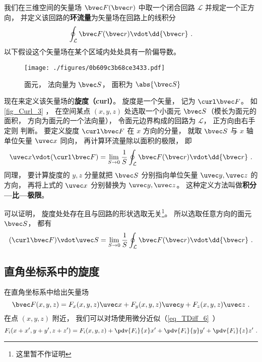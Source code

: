 

我们在三维空间的矢量场 $\bvec F(\bvec r)$ 中取一个闭合回路 $\mathcal L$ 并规定一个正方向， 并定义该回路的\textbf{环流量}为矢量场在回路上的线积分
\begin{equation}
\oint_{\mathcal L} \bvec F(\bvec r) \vdot \dd{\bvec r}~.
\end{equation}
以下假设这个矢量场在某个区域内处处具有一阶偏导数。

\begin{figure}[ht]
\centering
\texttt{[image: ./figures/0b609c3b68ce3433.pdf]}
\caption{面元， 法向量为 $\bvec S$， 面积为 $\abs{\bvec S}$}\label{fig_Curl_3}
\end{figure}

现在来定义该矢量场的\textbf{旋度（curl）}。 旋度是一个矢量， 记为 $\curl \bvec F$。 如\autoref{fig_Curl_3} ， 在空间某点 $(x,y,z)$ 处选取一个小面元 $\bvec S$（模长为面元的面积， 方向为面元的一个法向量）， 令面元边界构成的回路为 $\mathcal L$， 正方向由右手定则 判断。 要定义旋度 $\curl \bvec F$ 在 $x$ 方向的分量， 就取 $\bvec S$ 与 $x$ 轴单位矢量 $\uvec x$ 同向， 再计算环流量除以面积的极限， 即
\begin{equation}
\uvec x \vdot (\curl\bvec F) = \lim_{S\to 0} \frac 1S \oint_{\mathcal L} \bvec F(\bvec r) \vdot \dd{\bvec r}~.
\end{equation}
同理， 要计算旋度的 $y, z$ 分量就把 $\bvec S$ 分别指向单位矢量 $\uvec y, \uvec z$ 的方向， 再将上式的 $\uvec x$ 分别替换为 $\uvec y, \uvec z$。 这种定义方法叫做\textbf{积分—比—极限}。

可以证明， 旋度处处存在且与回路的形状选取无关\footnote{这里暂不作证明}。 所以选取任意方向的面元 $\bvec S$， 都有
\begin{equation}\label{eq_Curl_3}
(\curl\bvec F) \vdot \uvec S = \lim_{S\to 0} \frac 1S \oint_{\mathcal L} \bvec F(\bvec r) \vdot \dd{\bvec r}~.
\end{equation}

\subsection{直角坐标系中的旋度}
在直角坐标系中给出矢量场
\begin{equation}
\bvec F(x,y,z) = F_x(x,y,z)\uvec x + F_y(x,y,z)\uvec y + F_z(x,y,z)\uvec z~.
\end{equation}
在点 $(x,y,z)$ 附近， 我们可以对场使用微分近似（\autoref{eq_TDiff_6}~）
\begin{equation}
F_i(x+x', y+y', z+z') = F_i(x,y,z) + \pdv{F_i}{x}x' + \pdv{F_i}{y}y' + \pdv{F_i}{z}z'~.
\end{equation}

